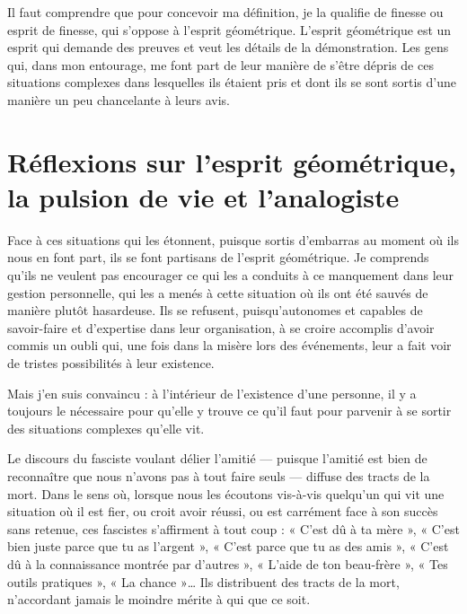 \documentclass[12pt,oneside]{article}
\begin{document}
Il faut comprendre que pour concevoir ma définition, je la qualifie de finesse ou esprit de finesse, qui s'oppose à l'esprit géométrique. L'esprit géométrique est un esprit qui demande des preuves et veut les détails de la démonstration. Les gens qui, dans mon entourage, me font part de leur manière de s'être dépris de ces situations complexes dans lesquelles ils étaient pris et dont ils se sont sortis d'une manière un peu chancelante à leurs avis.


\section{Réflexions sur l'esprit géométrique, la pulsion de vie et l'analogiste}

Face à ces situations qui les étonnent, puisque sortis d'embarras au moment où ils nous en font part, ils se font partisans de l'esprit géométrique. Je comprends qu'ils ne veulent pas encourager ce qui les a conduits à ce manquement dans leur gestion personnelle, qui les a menés à cette situation où ils ont été sauvés de manière plutôt hasardeuse. Ils se refusent, puisqu'autonomes et capables de savoir-faire et d'expertise dans leur organisation, à se croire accomplis d'avoir commis un oubli qui, une fois dans la misère lors des événements, leur a fait voir de tristes possibilités à leur existence.

Mais j'en suis convaincu : à l'intérieur de l'existence d'une personne, il y a toujours le nécessaire pour qu'elle y trouve ce qu'il faut pour parvenir à se sortir des situations complexes qu'elle vit.

Le discours du fasciste voulant délier l'amitié --- puisque l'amitié est bien de reconnaître que nous n'avons pas à tout faire seuls --- diffuse des tracts de la mort. Dans le sens où, lorsque nous les écoutons vis-à-vis quelqu'un qui vit une situation où il est fier, ou croit avoir réussi, ou est carrément face à son succès sans retenue, ces fascistes s'affirment à tout coup : « C'est dû à ta mère », « C'est bien juste parce que tu as l'argent », « C'est parce que tu as des amis », « C'est dû à la connaissance montrée par d'autres », « L'aide de ton beau-frère », « Tes outils pratiques », « La chance »\ldots{} Ils distribuent des tracts de la mort, n'accordant jamais le moindre mérite à qui que ce soit.
\end{document}
